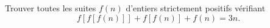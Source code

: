 Trouver toutes les suites $f(n)$ d'entiers strictement positifs vérifiant
\[ f[f[f(n)]] + f[f(n)] + f(n) = 3n. \]
